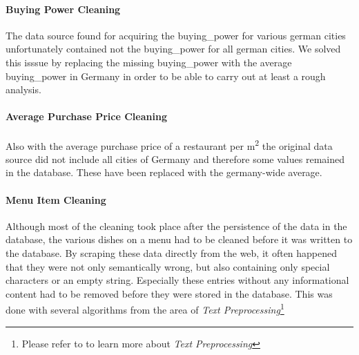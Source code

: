 \paragraph{Buying Power Cleaning}
The data source found for acquiring the buying\_power for various german cities unfortunately contained not the buying\_power for all german cities.
We solved this isssue by replacing the missing buying\_power with the average buying\_power in Germany in order to be able to carry out at least a rough analysis.
\paragraph{Average Purchase Price Cleaning}
Also with the average purchase price of a restaurant per m\textsuperscript{2} the original data source did not include all cities of Germany and therefore
some  values remained in the database.
These have been replaced with the germany-wide average.
\paragraph{Menu Item Cleaning}
Although most of the cleaning took place after the persistence of the data in the database, the various dishes on a menu had to be
cleaned before it was written to the database.
By scraping these data directly from the web, it often happened that they were not only semantically wrong, but also containing only
special characters or an empty string.
Especially these entries without any informational content had to be removed before they were stored in the database.
This was done with several algorithms from the area of \textit{Text Preprocessing}\footnote{Please refer to  to learn more about \textit{Text Preprocessing}}
